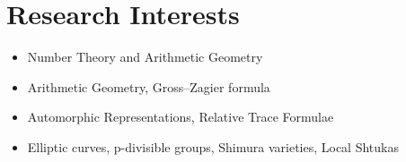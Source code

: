 \documentclass[a4paper,10pt]{article}
\begin{document}
\section*{Research Interests}
\begin{itemize}
    \item Number Theory and Arithmetic Geometry
    \item Arithmetic Geometry, Gross--Zagier formula
    \item Automorphic Representations, Relative Trace Formulae
    \item Elliptic curves, p-divisible groups, Shimura varieties, Local Shtukas
\end{itemize}
%
%
%
%
%
%
%
%
%
\end{document}
